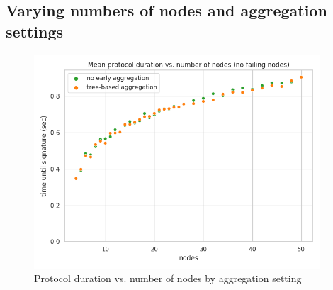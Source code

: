 \subsection*{Varying numbers of nodes and aggregation settings}

\begin{figure}[H]
    \centering
    \includegraphics[width=0.95\textwidth]{figures/4/round_wall_sum_by_mode.png}
    \captionsetup{labelformat=empty}
    \caption{Protocol duration vs. number of nodes by aggregation setting}
\end{figure}

